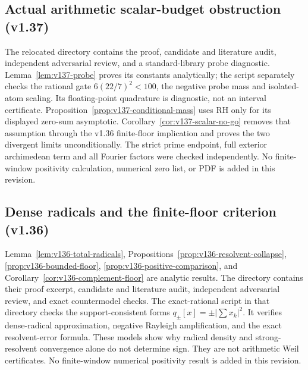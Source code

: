 \documentclass[11pt]{article}
\theoremstyle{remark}
\begin{document}
\subsection*{Actual arithmetic scalar-budget obstruction (v1.37)}
The relocated directory  contains the proof,
candidate and literature audit, independent adversarial review, and a
standard-library probe diagnostic. Lemma~\ref{lem:v137-probe} proves its
constants analytically; the script separately checks the rational gate
$6(22/7)^2<100$, the negative probe mass and isolated-atom scaling.
Its floating-point quadrature is diagnostic, not an interval certificate.
Proposition~\ref{prop:v137-conditional-mass} uses RH only for its displayed
zero-sum asymptotic. Corollary~\ref{cor:v137-scalar-no-go} removes that
assumption through the v1.36 finite-floor implication and proves the two
divergent limits unconditionally. The strict prime endpoint, full exterior
archimedean term and all Fourier factors were checked independently.
No finite-window positivity calculation, numerical zero list, or PDF is
added in this revision.

\subsection*{Dense radicals and the finite-floor criterion (v1.36)}
Lemma~\ref{lem:v136-total-radicals},
Propositions~\ref{prop:v136-resolvent-collapse},
\ref{prop:v136-bounded-floor}, \ref{prop:v136-positive-comparison}, and
Corollary~\ref{cor:v136-complement-floor} are analytic results. The directory
 contains their proof excerpt, candidate and
literature audit, independent adversarial review, and exact countermodel
checks. The exact-rational script in that directory checks the support-consistent forms
$q_\pm[x]=\pm|\sum x_k|^2$. It verifies dense-radical approximation,
negative Rayleigh amplification, and the exact resolvent-error formula.
These models show why radical density and strong-resolvent convergence
alone do not determine sign. They are not arithmetic Weil certificates.
No finite-window numerical positivity result is added in this revision.
\end{document}
